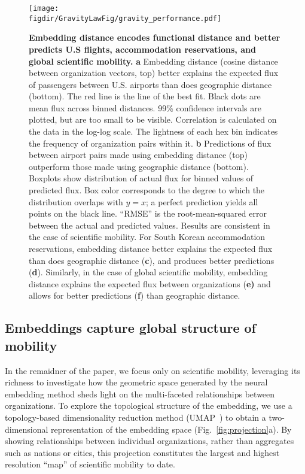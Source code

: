 \documentclass[12pt]{article} %
\def\figdir{../Figs}
\begin{document}
%
%
\begin{figure}[h!]
	\centering
	\texttt{[image: \\figdir/GravityLawFig/gravity\_performance.pdf]}
	\caption{
		\textbf{Embedding distance encodes functional distance and better predicts U.S flights, accommodation reservations, and global scientific mobility.}
		\textbf{a} Embedding distance (cosine distance between organization vectors, top) better explains the expected flux of passengers between U.S. airports than does geographic distance (bottom). 
		The red line is the line of the best fit.
		Black dots are mean flux across binned distances.
		99\% confidence intervals are plotted, but are too small to be visible.
		Correlation is calculated on the data in the log-log scale. 
		The lightness of each hex bin indicates the frequency of organization pairs within it.
		\textbf{b} Predictions of flux between airport pairs made using embedding distance (top) outperform those made using geographic distance (bottom). 
		Boxplots show distribution of actual flux for binned values of predicted flux.
		Box color corresponds to the degree to which the distribution overlaps with $y = x$;
		a perfect prediction yields all points on the black line.
		``RMSE'' is the root-mean-squared error between the actual and predicted values.
		Results are consistent in the case of scientific mobility. 
		For South Korean accommodation reservations, embedding distance better explains the expected flux than does geographic distance (\textbf{c}), and produces better predictions (\textbf{d}).
		Similarly, in the case of global scientific mobility, embedding distance explains the expected flux between organizations (\textbf{e)} and allows for better predictions (\textbf{f}) than geographic distance.
	}
	\label{fig:gravity_performance}
\end{figure}


\subsection*{Embeddings capture global structure of mobility}

In the remaidner of the paper, we focus only on scientific mobility, leveraging its richness to investigate how the geometric space generated by the neural embedding method sheds light on the multi-faceted relationships between organizations. 
To explore the topological structure of the embedding, we use a topology-based dimensionality reduction method (UMAP~\autocite{mcinnes2018umap}) to obtain a two-dimensional representation of the embedding space (Fig.~\ref{fig:projection}a).
By showing relationships between individual organizations, rather than aggregates such as nations or cities, this projection constitutes the largest and highest resolution ``map'' of scientific mobility to date.
\end{document}
